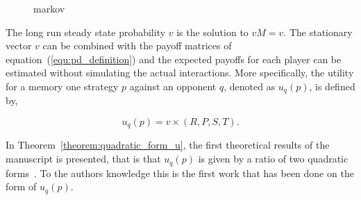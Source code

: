 \documentclass[10pt]{article}
\begin{document}
\begin{figure}
    \begin{minipage}{0.35\textwidth}
        
        \caption{markov}
        \label{fig:markov_chain}
    \end{minipage}
    \begin{minipage}{0.45\textwidth}
    \begin{equation*}
        
    \end{equation*}
    \end{minipage}
\end{figure}

The long run steady state probability \(v\) is the solution to \(v M = v\). The
stationary vector \(v\) can be combined with the payoff matrices of
equation~(\ref{equ:pd_definition}) and the expected payoffs for each player
can be estimated without simulating the actual interactions. More
specifically, the utility for a memory one strategy \(p\) against an opponent \(q\),
denoted as \(u_q(p)\), is defined by,

\begin{equation}\label{eq:press_dyson_utility}
    u_q(p) = v \times (R, P, S, T).
\end{equation}

In Theorem~\ref{theorem:quadratic_form_u}, the first theoretical results of
the manuscript is presented, that is that \(u_q(p)\) is given by a ratio of
two quadratic forms~\cite{kepner2011}. To the authors knowledge this is the
first work that has been done on the form of \(u_q(p)\).
\end{document}
